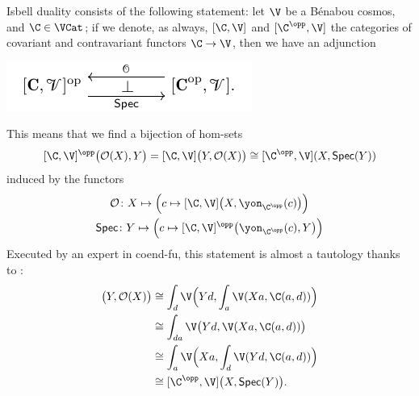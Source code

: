 \begin{example}\label{isbella-duella}
Isbell duality consists of the following statement: let $\V$ be a Bénabou cosmos, and $\C \in \VCat$; if we denote, as always, $[\C, \V]$ and $[\C^\opp,\V]$ the categories of covariant and contravariant functors $\C \to \V$, then we have an adjunction
\begin{center}
\includegraphics[scale=1]{figures/fig4}
\end{center}
This means that we find a bijection of hom-sets
\[
[\C, \V]^\opp\big( \mathcal{O}(X), Y\big) = [\C, \V]\big(Y, \mathcal{O}(X)\big)\cong [\C^\opp, \V](X, \textsf{Spec}(Y))
\]
induced by the functors
\begin{gather*}
\mathcal O \colon X \mapsto \Big( c\mapsto [\C, \V]\big(X, \yon_{\C^\opp}(c)\big)\Big)\\
\textsf{Spec}\colon Y\mapsto \Big( c \mapsto [\C,\V]^\opp\big( \yon_{\C^\opp}(c),Y \big) \Big)
\end{gather*}
Executed by an expert in coend-fu, this statement is almost a tautology thanks to \athm{}:
\begin{align*}
[\C, \V]\big(Y, \mathcal{O}(X)\big) & \cong \int_d \V\Big(Yd, \int_a \V(Xa, \C(a,d))\Big)\\
&\cong \int_{da}\V\big(Yd,\V(Xa, \C(a,d))\big)\\
&\cong \int_a\V\Big(Xa,\int_d\V(Yd, \C(a,d))\Big)\\
&\cong [\C^\opp,\V]\big(X, \textsf{Spec}(Y)\big).
\end{align*}
\end{example}
